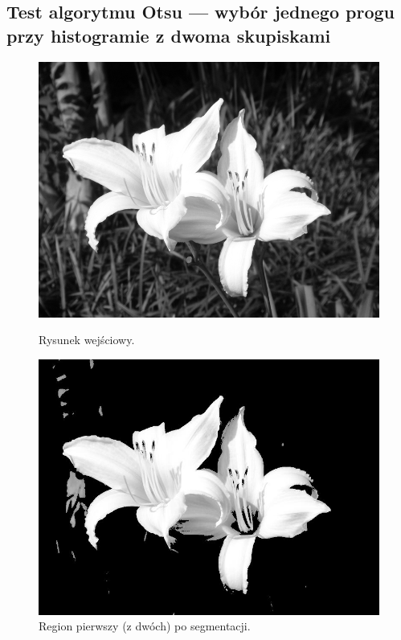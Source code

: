 \documentclass[10pt]{llncs}
\begin{document}
\subsection{Test algorytmu Otsu --- wybór jednego progu przy histogramie z dwoma skupiskami}

\begin{figure}[!htb]
  \includegraphics[width=\linewidth]{img/01.jpg}
  \caption{Rysunek wejściowy.}\label{fig:1}
\endminipage\hfill
{}
  \includegraphics[width=\linewidth]{img/01_region_01.jpg}
  \caption{Region pierwszy (z dwóch) po segmentacji.}\label{fig:2}
\endminipage\hfill
{}

\end{figure}
\end{document}
